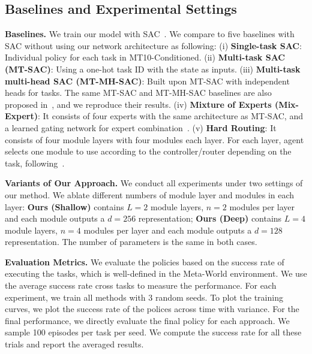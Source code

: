 \documentclass{article}
\begin{document}
\vspace{-0.07in}
\subsection{Baselines and Experimental Settings}
\vspace{-0.07in}

\textbf{Baselines.} We train our model with SAC~\cite{DBLP:journals/corr/abs-1801-01290}. We compare to five baselines with SAC without using our network architecture as following: (i) \textbf{Single-task SAC}: Individual policy for each task in MT10-Conditioned.
(ii) \textbf{Multi-task SAC (MT-SAC)}: Using a one-hot task ID with the state as inputs. (iii) \textbf{Multi-task multi-head SAC (MT-MH-SAC)}: Built upon MT-SAC with independent heads for tasks. The same MT-SAC and MT-MH-SAC baselines are also proposed in~\cite{yu2019meta}, and we reproduce their results. (iv) \textbf{Mixture of Experts (Mix-Expert)}: It consists of four experts with the same architecture as MT-SAC, and a learned gating network for expert combination~\cite{jacobs1991}. (v) \textbf{Hard Routing}: It consists of four module layers with four modules each layer. For each layer, agent selects one module to use according to the controller/router depending on the task, following~\cite{rosenbaum2017routing}.



\textbf{Variants of Our Approach.} We conduct all experiments under two settings of our method. We ablate different numbers of module layer and modules in each layer: \textbf{Ours (Shallow)} contains $L=2$ module layers, $n=2$ modules per layer and each module outputs a $d=256$ representation; \textbf{Ours (Deep)} contains $L=4$ module layers, $n=4$ modules per layer and each module outputs a $d=128$ representation. The number of parameters is the same in both cases.


\textbf{Evaluation Metrics.} We evaluate the policies based on the success rate of executing the tasks, which is well-defined in the Meta-World environment\cite{yu2019meta}. We use the average success rate cross tasks to measure the performance. For each experiment, we train all methods with 3 random seeds. To plot the training curves, we plot the success rate of the polices across time with variance. For the final performance, we directly evaluate the final policy for each approach. We sample 100 episodes per task per seed. We compute the success rate for all these trials and report the averaged results. 
\end{document}
